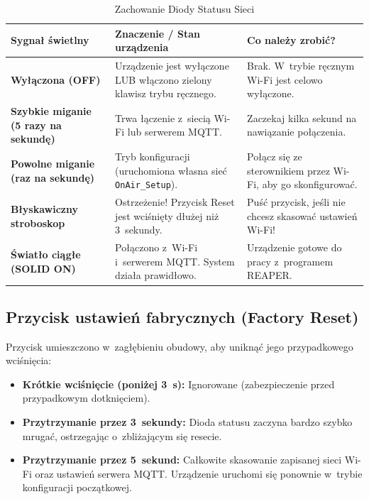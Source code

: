 \documentclass[11pt,a4paper]{article}
\begin{document}
\begin{table}[H]
\centering
\renewcommand{\arraystretch}{1.35}
\caption{Zachowanie Diody Statusu Sieci}
\label{tab:status_led}
\begin{tabularx}{\textwidth}{>{\raggedright\arraybackslash\bfseries}p{3.8cm} >{\raggedright\arraybackslash}X >{\raggedright\arraybackslash}p{4.5cm}}
\toprule
\textbf{Sygnał świetlny} & \textbf{Znaczenie / Stan urządzenia} & \textbf{Co należy zrobić?} \\
\midrule
Wyłączona (OFF) & Urządzenie jest wyłączone LUB włączono zielony klawisz trybu ręcznego. & Brak. W~trybie ręcznym Wi-Fi jest celowo wyłączone. \\
\addlinespace[3pt]
Szybkie miganie (5 razy na sekundę) & Trwa łączenie z~siecią Wi-Fi lub serwerem MQTT. & Zaczekaj kilka sekund na nawiązanie połączenia. \\
\addlinespace[3pt]
Powolne miganie (raz na sekundę) & Tryb konfiguracji (uruchomiona własna sieć \texttt{OnAir\_Setup}). & Połącz się ze sterownikiem przez Wi-Fi, aby go skonfigurować. \\
\addlinespace[3pt]
Błyskawiczny stroboskop & Ostrzeżenie! Przycisk Reset jest wciśnięty dłużej niż 3~sekundy. & Puść przycisk, jeśli nie chcesz skasować ustawień Wi-Fi! \\
\addlinespace[3pt]
Światło ciągłe (SOLID ON) & Połączono z~Wi-Fi i~serwerem MQTT. System działa prawidłowo. & Urządzenie gotowe do pracy z~programem REAPER. \\
\bottomrule
\end{tabularx}
\end{table}

\subsection{Przycisk ustawień fabrycznych (Factory Reset)}
Przycisk umieszczono w~zagłębieniu obudowy, aby uniknąć jego przypadkowego wciśnięcia:
\begin{itemize}[leftmargin=1.5em]
    \item \textbf{Krótkie wciśnięcie (poniżej 3~s):} Ignorowane (zabezpieczenie przed przypadkowym dotknięciem).
    \item \textbf{Przytrzymanie przez 3~sekundy:} Dioda statusu zaczyna bardzo szybko mrugać, ostrzegając o~zbliżającym się resecie.
    \item \textbf{Przytrzymanie przez 5~sekund:} Całkowite skasowanie zapisanej sieci Wi-Fi oraz ustawień serwera MQTT. Urządzenie uruchomi się ponownie w~trybie konfiguracji początkowej.
\end{itemize}
\newpage
\end{document}
